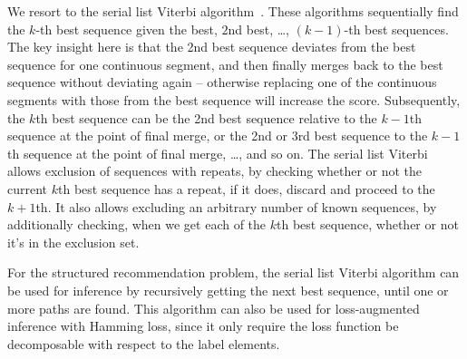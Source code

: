 We resort to the serial list Viterbi algorithm~\cite{nilsson2001sequentially}.
These algorithms sequentially find the $k$-th best sequence given the best, $2$nd best, \dots, $(k-1)$-th best sequences.
The key insight here is that the 2nd best sequence deviates from the best sequence
for one continuous segment, and then finally merges back to the best sequence without deviating again
-- otherwise replacing one of the continuous segments with those from the best sequence will increase the score.
Subsequently, the $k$th best sequence can be the 2nd best sequence relative to the $k-1$th sequence
at the point of final merge, or the 2nd or 3rd best sequence to the $k-1$th sequence at the point of final merge, \ldots, and so on.
The serial list Viterbi allows exclusion of sequences with repeats, by checking whether or not the current $k$th best sequence has a repeat, if it does, discard and proceed to the $k+1$th. It also allows excluding an arbitrary number of known sequences, by additionally checking, when we get each of the $k$th best sequence, whether or not it's in the exclusion set.

For the structured recommendation problem, the serial list Viterbi algorithm can be used for inference
by recursively getting the next best sequence, until one or more paths are found.
This algorithm can also be used for loss-augmented inference with Hamming loss,
since it only require the loss function be decomposable with respect to the label elements.

